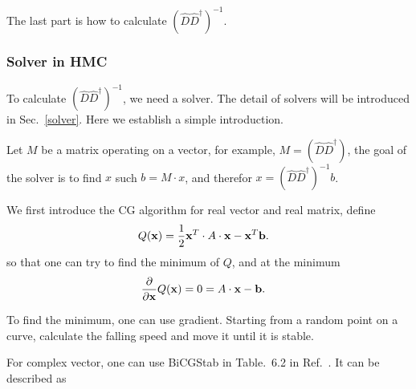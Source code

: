 The last part is how to calculate $(\hat{D}\hat{D}^{\dagger})^{-1}$.

\subsubsection{\label{Solver_In_HMC}Solver in HMC}

To calculate $(\hat{D}\hat{D}^{\dagger})^{-1}$, we need a solver. The detail of solvers will be introduced in Sec.~\ref{solver}. Here we establish a simple introduction.

Let $M$ be a matrix operating on a vector, for example, $M=(\hat{D}\hat{D}^{\dagger})$, the goal of the solver is to find $x$ such $b=M\cdot x$, and therefor $x=(\hat{D}\hat{D}^{\dagger})^{-1}b$.

We first introduce the CG algorithm for real vector and real matrix, define
\begin{equation}
\begin{split}
&Q({\bf x})=\frac{1}{2}{\bf x}^T \cdot A \cdot {\bf x}-{\bf x}^T {\bf b}.
\end{split}
\end{equation}
so that one can try to find the minimum of $Q$, and at the minimum
\begin{equation}
\begin{split}
&\frac{\partial }{\partial {\bf x}}Q({\bf x})=0=A\cdot {\bf x}-{\bf b}.
\end{split}
\end{equation}

To find the minimum, one can use gradient. Starting from a random point on a curve, calculate the falling speed and move it until it is stable.

For complex vector, one can use BiCGStab in Table.~6.2 in Ref.~\cite{latticeqcdbook2010}. It can be described as

